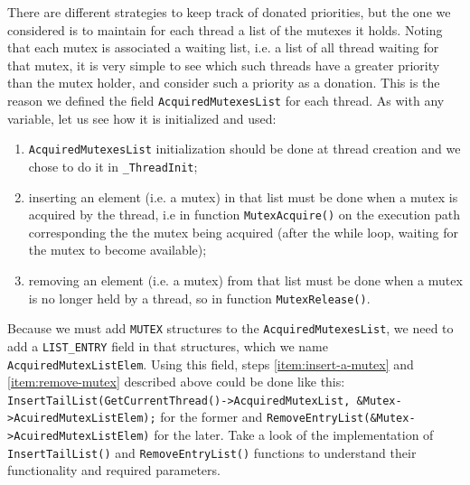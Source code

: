 There are different strategies to keep track of donated priorities, but the one we considered is to maintain for each thread a list of the mutexes it holds. Noting that each mutex is associated a waiting list, i.e. a list of all thread waiting for that mutex, it is very simple to see which such threads have a greater priority than the mutex holder, and consider such a priority as a donation. This is the reason we defined the field \lstinline|AcquiredMutexesList| for each thread. As with any variable, let us see how it is initialized and used:
\begin{enumerate}
    \item \lstinline|AcquiredMutexesList| initialization should be done at thread creation and we chose to do it in \lstinline|_ThreadInit|;
    
    \item \label{item:insert-a-mutex} inserting an element (i.e. a mutex) in that list must be done when a mutex is acquired by the thread, i.e in function \lstinline|MutexAcquire()| on the execution path corresponding the the mutex being acquired (after the while loop, waiting for the mutex to become available);
    
    \item \label{item:remove-mutex}removing an element (i.e. a mutex) from that list must be done when a mutex is no longer held by a thread, so in function \lstinline|MutexRelease()|. 
\end{enumerate}

Because we must add \lstinline|MUTEX| structures to the \lstinline|AcquiredMutexesList|, we need to add a \lstinline|LIST_ENTRY| field in that structures, which we name \lstinline|AcquiredMutexListElem|. Using this field, steps \ref{item:insert-a-mutex} and \ref{item:remove-mutex} described above could be done like this: \lstinline|InsertTailList(GetCurrentThread()->AcquiredMutexList, &Mutex->AcuiredMutexListElem);| for the former and \lstinline|RemoveEntryList(&Mutex->AcuiredMutexListElem)| for the later. Take a look of the implementation of \lstinline|InsertTailList()| and \lstinline|RemoveEntryList()| functions to understand their functionality and required parameters. 

